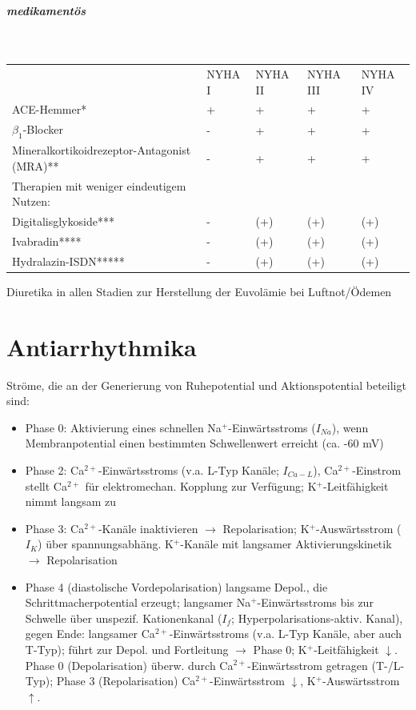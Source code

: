 \documentclass[10pt,a4paper]{report}
\begin{document}
\paragraph{medikamentös} \mbox{} \\
\begin{tabularx}{\textwidth}{XXXXX}
&NYHA I&NYHA II&NYHA III&NYHA IV\\
ACE-Hemmer*&+&+&+&+\\
$\beta_1$-Blocker&-&+&+&+\\
Mineralkortikoidrezeptor-Antagonist (MRA)**&-&+&+&+\\
Therapien mit weniger eindeutigem Nutzen:&&&&\\
Digitalisglykoside***&-&(+)&(+)&(+)\\
Ivabradin****&-&(+)&(+)&(+)\\
Hydralazin-ISDN*****&-&(+)&(+)&(+)\\
\end{tabularx}
Diuretika in allen Stadien zur Herstellung der Euvolämie bei Luftnot/Ödemen
\chapter{Antiarrhythmika}
Ströme, die an der Generierung von Ruhepotential und Aktionspotential beteiligt sind: 
\begin{itemize}
	\item Phase 0: Aktivierung eines schnellen Na$^+$-Einwärtsstroms ($I_{Na}$), wenn Membranpotential einen bestimmten Schwellenwert erreicht  (ca. -60 mV)
	\item Phase 2: Ca$^{2+}$-Einwärtsstroms (v.a. L-Typ Kanäle; $I_{Ca-L}$), Ca$^{2+}$-Einstrom stellt Ca$^{2+}$ für elektromechan. Kopplung zur Verfügung; K$^+$-Leitfähigkeit nimmt langsam zu
	\item Phase 3: Ca$^{2+}$-Kanäle inaktivieren $\rightarrow$ Repolarisation; K$^+$-Auswärtsstrom ($I_K$) über spannungsabhäng. K$^+$-Kanäle mit langsamer Aktivierungskinetik $\rightarrow$ Repolarisation 
	\item Phase 4 (diastolische Vordepolarisation) langsame Depol., die Schrittmacherpotential erzeugt; langsamer Na$^+$-Einwärtsstroms bis zur Schwelle über unspezif. Kationenkanal ($I_f$; Hyperpolarisations-aktiv. Kanal), gegen Ende: langsamer Ca$^{2+}$-Einwärtsstroms (v.a. L-Typ Kanäle, aber auch T-Typ); führt zur Depol. und Fortleitung  $\rightarrow$ Phase 0;
K$^+$-Leitfähigkeit $\downarrow$. Phase 0 (Depolarisation) überw. durch Ca$^{2+}$-Einwärtsstrom getragen (T-/L-Typ); Phase 3 (Repolarisation) Ca$^{2+}$-Einwärtsstrom $\downarrow$, K$^+$-Auswärtsstrom $\uparrow$. 
\end{itemize}
\end{document}
